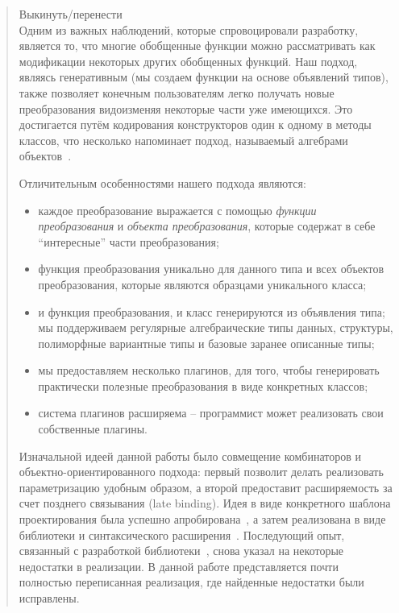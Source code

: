\blockquote{Выкинуть/перенести\\
Одним из важных наблюдений, которые спровоцировали разработку, является то, что многие обобщенные функции можно рассматривать как модификации некоторых других обобщенных функций. Наш подход, являясь генеративным (мы создаем функции на основе объявлений типов), также позволяет конечным пользователям легко получать новые преобразования видоизменяя некоторые части уже имеющихся. Это достигается путём кодирования конструкторов один к одному в методы классов, что несколько напоминает подход, называемый алгебрами объектов~\cite{ObjectAlgebras}.

Отличительным особенностями нашего подхода являются:

\begin{itemize}
\item каждое преобразование выражается с помощью \emph{функции преобразования} и \emph{объекта преобразования}, которые содержат в себе ``интересные'' части преобразования;
\item функция преобразования уникально для данного типа и всех объектов преобразования, которые являются образцами уникального класса;
\item и функция преобразования, и класс генерируются из объявления типа; мы поддерживаем регулярные алгебраические типы данных, структуры, полиморфные вариантные типы и базовые заранее описанные типы;
\item мы предоставляем несколько плагинов, для того, чтобы генерировать практически полезные преобразования в виде конкретных классов;
\item система плагинов расширяема -- программист может реализовать свои собственные плагины.
\end{itemize}



Изначальной идеей данной работы было совмещение комбинаторов и объектно-ориентированного подхода: первый позволит делать реализовать параметризацию удобным образом, а второй предоставит расширяемость за счет позднего связывания (late binding). Идея в виде конкретного шаблона проектирования была успешно апробирована~\cite{SCICO}, а затем реализована в виде библиотеки и синтаксического расширения~\cite{TransformationObjects}. Последующий опыт, связанный с разработкой библиотеки~\cite{OCanren}, снова указал на некоторые недостатки в реализации. В данной работе представляется почти полностью переписанная реализация, где найденные недостатки были исправлены.
}

